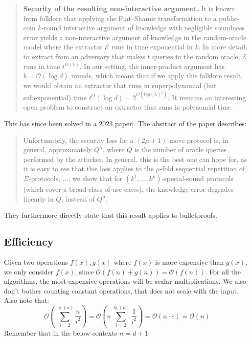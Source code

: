 \documentclass[
]{article}
\newcommand*\Ec{\mathcal{E}}
\newcommand*\Oc{\mathcal{O}}
\renewcommand*\l{\lambda}
\begin{document}
\begin{quote}
\color{GbGrey}

\textbf{Security of the resulting non-interactive argument.} It is known
from folklore that applying the Fiat–Shamir transformation to a public-coin
$k$-round interactive argument of knowledge with negligible soundness error
yields a non-interactive argument of knowledge in the random-oracle model
where the extractor $\Ec$ runs in time exponential in $k$. In more detail,
to extract from an adversary that makes $t$ queries to the random oracle,
$\Ec$ runs in time $t^{O(k)}$. In our setting, the inner-product argument has
$k = \Oc(\log d)$ rounds, which means that if we apply this folklore result, we
would obtain an extractor that runs in superpolynomial (but subexponential)
time $t^O(\log d) = 2^{O(log(\l)^2)}$. It remains an interesting open problem
to construct an extractor that runs in polynomial time.

\end{quote}

This has since been solved in a 2023
paper{[}\citeproc{ref-attema}{Attema et al. 2023}{]}. The abstract of
the paper describes:

\begin{quote}
\color{GbGrey}

Unfortunately, the security loss for a $(2\mu + 1)$-move protocol is, in
general, approximately $Q^\mu$, where $Q$ is the number of oracle queries
performed by the attacker. In general, this is the best one can hope for,
as it is easy to see that this loss applies to the $\mu$-fold sequential
repetition of $\Sigma$-protocols, $\dots$, we show that for $(k^1, \dots,
k^\mu)$-special-sound protocols (which cover a broad class of use cases),
the knowledge error degrades linearly in $Q$, instead of $Q^\mu$.

\end{quote}

They furthermore directly state that this result applies to
bulletproofs.

\subsection{Efficiency}\label{efficiency}

Given two operations \(f(x), g(x)\) where \(f(x)\) is more expensive
than \(g(x)\), we only consider \(f(x)\), since
\(\Oc(f(n) + g(n)) = \Oc (f(n))\). For all the algorithms, the most
expensive operations will be scalar multiplications. We also don't
bother counting constant operations, that does not scale with the input.
Also note that: \[
  \Oc\left(\sum_{i=2}^{\lg(n)} \frac{n}{i^2}\right) = \Oc\left(n \sum_{i=2}^{\lg(n)} \frac{1}{i^2}\right)
                                       = \Oc(n \cdot c)
                                       = \Oc(n)
\] Remember that in the below contexts \(n = d+1\)
\end{document}
